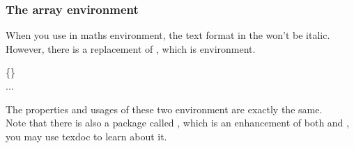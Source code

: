 \begin{frame}
	\frametitle{The array environment}
	When you use  in maths environment, the text format in the  won't be italic. However, there is a replacement of , which is  environment.
	\begin{command}
		\{\}\\
		\qquad ...\\
	\end{command}
	The properties and usages of these two environment are exactly the same. \\[0.5em]
	Note that there is also a package called , which is an enhancement of both  and , you may use \alert{texdoc}  to learn about it.
	
\end{frame}